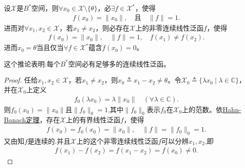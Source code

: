 \documentclass[../../main.tex]{subfiles}%
\begin{document}
\begin{corollary}\label{corollary:泛函分析--推论2.4.6}
设$\mathscr{X}$是$B^*$空间，则$\forall x_0 \in \mathscr{X} \setminus \{\theta\}$，必$\exists f \in \mathscr{X}^*$，使得
\begin{align*}
f(x_0) = \|x_0\|, \quad \text{且} \quad \|f\| = 1.
\end{align*}
进而对$\forall x_1, x_2 \in \mathscr{X}$，若$x_1 \neq x_2$，则必存在$\mathscr{X}$上的非零连续线性泛函$f$，使得
\begin{align*}
f(x_0) = \|x_0\|, \quad \|f\| = 1,\quad f(x_1) \neq f(x_2).
\end{align*}
进而$x_0 = \theta$当且仅当$\forall f \in \mathscr{X}^*$蕴含$f(x_0) = 0$。
\end{corollary}
\begin{remark}
这个推论表明:每个$B^*$空间必有足够多的连续线性泛函。
\end{remark}
\begin{proof}

任给$x_1, x_2 \in \mathscr{X}$，若$x_1 \neq x_2$，则$x_0 \triangleq x_1 - x_2 \neq \theta$。令$\mathscr{X}_0 \triangleq \{\lambda x_0 \mid \lambda \in \mathbb{C}\}$，并在$\mathscr{X}_0$上定义
\begin{align*}
f_0(\lambda x_0) = \lambda \|x_0\| \quad (\forall \lambda \in \mathbb{C}).
\end{align*}
则$f_0(x_0) = \|x_0\|$且$\|f_0\|_0 = 1$,其中$\|f_0\|_0$表示$f_0$在$\mathscr{X}_0$上的范数。依\hyperref[theorem:泛函分析--(哈恩-巴拿赫)Hahn-Banach定理]{Hahn-Banach定理}，存在$\mathscr{X}$上的有界线性泛函$f$，使得
\begin{align*}
f(x_0) = f_0(x_0) = \|x_0\|, \quad \|f\| = \|f_0\|_0 = 1.
\end{align*}
又由知$f$是连续的.并且$\mathscr{X}$上的这个非零连续线性泛函$f$可以分辨$x_1, x_2$,即
\begin{align*}
f(x_1) - f(x_2) = f(x_1 - x_2) = f(x_0) \neq 0.
\end{align*}

\end{proof}
\end{document}

